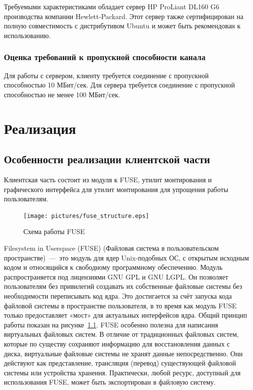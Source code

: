 \documentclass[utf8,usehyperref,12pt]{G7-32}
\begin{document}
Требуемыми характеристиками обладает сервер HP ProLiant DL160 G6 производства компании Hewlett-Packard. Этот сервер также сертифицирован на полную совместимость с дистрибутивом Ubuntu и может быть рекомендован к использованию.

\subsection{Оценка требований к пропускной способности канала}
Для работы с сервером, клиенту требуется соединение с пропускной способностью 10 МБит/сек. Для сервера требуется соединение с пропускной способностью не менее 100 МБит/сек.

\chapter{Реализация}

\section{Особенности реализации клиентской части}
Клиентская часть состоит из модуля к FUSE, утилит монтирования и графического интерфейса для утилит монтирования для упрощения работы пользователям. 

\begin{figure}[ht]
   \centering%
   \texttt{[image: pictures/fuse\_structure.eps]}
   \caption{Схема работы FUSE}\label{fig:fuse_structure}
 \end{figure}

Filesystem in Userspace (FUSE) (Файловая система в пользовательском пространстве)~—~это модуль для ядер Unix-подобных ОС, с открытым исходным кодом и относящийся к свободному программному обеспечению. Модуль распространяется под лицензиями GNU GPL и GNU LGPL. Он позволяет пользователям без привилегий создавать их собственные файловые системы без необходимости переписывать код ядра. Это достигается за счёт запуска кода файловой системы в пространстве пользователя, в то время как модуль FUSE только предоставляет «мост» для актуальных интерфейсов ядра. Общий принцип работы показан на рисунке~\ref{fig:fuse_structure}. FUSE особенно полезна для написания виртуальных файловых систем. В отличие от традиционных файловых систем, которые по существу сохраняют информацию для восстановления данных с диска, виртуальные файловые системы не хранят данные непосредственно. Они действуют как представление, трансляция (перевод) существующей файловой системы или устройства хранения. Практически, любой ресурс, доступный для использования FUSE, может быть экспортирован в файловую систему.
\end{document}
